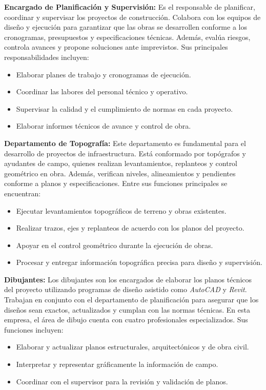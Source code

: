 \documentclass[12pt]{article}
\begin{document}
	\textbf{Encargado de Planificación y Supervisión:}  
	Es el responsable de planificar, coordinar y supervisar los proyectos de construcción. Colabora con los equipos de diseño y ejecución para garantizar que las obras se desarrollen conforme a los cronogramas, presupuestos y especificaciones técnicas. Además, evalúa riesgos, controla avances y propone soluciones ante imprevistos.  
	Sus principales responsabilidades incluyen:
	\begin{itemize}
		\item Elaborar planes de trabajo y cronogramas de ejecución.
		\item Coordinar las labores del personal técnico y operativo.
		\item Supervisar la calidad y el cumplimiento de normas en cada proyecto.
		\item Elaborar informes técnicos de avance y control de obra.
	\end{itemize}
	
	\textbf{Departamento de Topografía:}  
	Este departamento es fundamental para el desarrollo de proyectos de infraestructura. Está conformado por topógrafos y ayudantes de campo, quienes realizan levantamientos, replanteos y control geométrico en obra. Además, verifican niveles, alineamientos y pendientes conforme a planos y especificaciones.  
	Entre sus funciones principales se encuentran:
	\begin{itemize}
		\item Ejecutar levantamientos topográficos de terreno y obras existentes.
		\item Realizar trazos, ejes y replanteos de acuerdo con los planos del proyecto.
		\item Apoyar en el control geométrico durante la ejecución de obras.
		\item Procesar y entregar información topográfica precisa para diseño y supervisión.
	\end{itemize}
	
	\textbf{Dibujantes:}  
	Los dibujantes son los encargados de elaborar los planos técnicos del proyecto utilizando programas de diseño asistido como \textit{AutoCAD} y \textit{Revit}. Trabajan en conjunto con el departamento de planificación para asegurar que los diseños sean exactos, actualizados y cumplan con las normas técnicas. En esta empresa, el área de dibujo cuenta con cuatro profesionales especializados.  
	Sus funciones incluyen:
	\begin{itemize}
		\item Elaborar y actualizar planos estructurales, arquitectónicos y de obra civil.
		\item Interpretar y representar gráficamente la información de campo.
		\item Coordinar con el supervisor para la revisión y validación de planos.
	\end{itemize}
	
\end{document}
